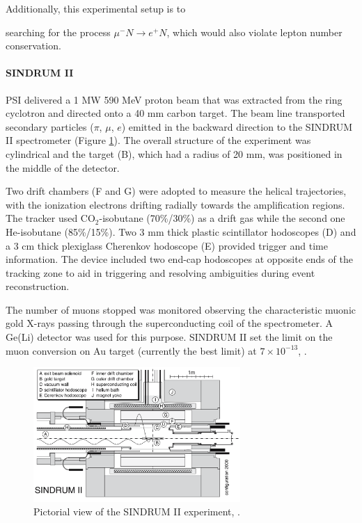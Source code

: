 

Additionally, this experimental setup is  to

searching for the process $\mu^- N \rightarrow e^+ N$, which would also violate lepton number conservation.
\paragraph{SINDRUM II}
PSI delivered a 1 MW 590 MeV proton 
beam that was extracted from the ring
cyclotron and directed onto a 40 
mm carbon target. The beam line
transported secondary particles ($\pi$, $\mu$, $e$) 
emitted in the backward 
direction to the SINDRUM II spectrometer 
(Figure \ref{fig:sindrumii}).
The overall structure of the experiment
was cylindrical and the target (B), 
which had a radius of 20 mm, was positioned
in the middle of the detector.

Two drift chambers (F and G) were adopted to measure
the helical trajectories, with the 
ionization electrons drifting radially 
towards the amplification 
regions. The tracker used CO$_2$-isobutane 
(70\%/30\%) as a drift
gas while the second one He-isobutane 
(85\%/15\%). Two 3 mm thick plastic 
scintillator hodoscopes (D) and a 3 cm 
thick plexiglass Cherenkov hodoscope 
(E) provided trigger and time information. 
The device included two end-cap hodoscopes 
at opposite ends of the tracking zone to 
aid in triggering 
and resolving ambiguities during event reconstruction.

The number of muons stopped
was monitored observing the characteristic 
muonic gold X-rays passing through the
superconducting coil of the spectrometer. 
A Ge(Li) detector was used for this purpose.
SINDRUM II set the limit on the 
muon conversion on Au target 
(currently the best limit) at $7 \times 10^{-13}$, 
\cite{SINDRUMII:2006dvw}.

\begin{figure}[!h]
\centering
\includegraphics[width =0.7\textwidth]{figures/png/Screenshot_20240307_163120.png}
\caption[SINDRUM II experiment.]{Pictorial view of the SINDRUM II experiment, \cite{SINDRUMII:2006dvw}.}
\label{fig:sindrumii}
\end{figure}
